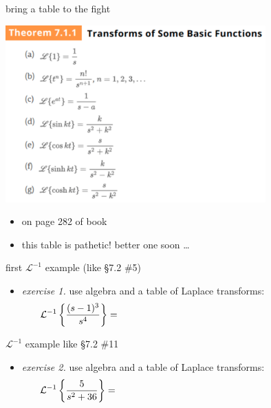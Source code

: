 \documentclass[urlcolor=blue,dvipsnames]{beamer}
\begin{document}
\begin{frame}{bring a table to the fight}

\begin{center}
\includegraphics[width=0.75\textwidth]{figs/laplacetable.pdf}
\end{center}

\begin{itemize}
\item on page 282 of book
\item this table is pathetic!  better one soon \dots
\end{itemize}
\end{frame}


\begin{frame}{first $\mathcal{L}^{-1}$ example (like \S7.2 \#5)}

\begin{itemize}
\item \emph{exercise 1.}  use algebra and a table of Laplace transforms:
    $$\LLi{\frac{(s-1)^3}{s^4}} = \hspace{80mm}$$
\end{itemize}

\vspace{50mm}
\end{frame}


\begin{frame}{$\mathcal{L}^{-1}$ example like \S7.2 \#11}

\begin{itemize}
\item \emph{exercise 2.}  use algebra and a table of Laplace transforms:
    $$\LLi{\frac{5}{s^2+36}} = \hspace{80mm}$$
\end{itemize}

\vspace{50mm}
\end{frame}
\end{document}
